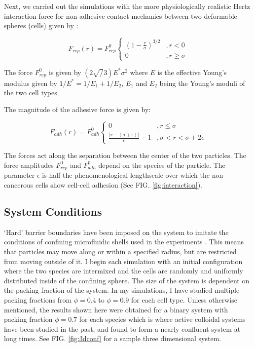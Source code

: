 \documentclass[aps,prb,twocolumn,groupedaddress,nofootinbib,floatfix]{revtex4}
\begin{document}
Next, we carried out the simulations with the more physiologically realistic Hertz interaction force for non-adhesive contact mechanics between two deformable spheres (cells) given by \cite{}:

\begin{equation}
  F_{rep}(r) = F^0_{rep} \left\{ 
    \begin{array}{lr}
      (1-\frac{r}{\sigma})^{3/2} &, r < 0\\
      0 &, r \ge \sigma
    \end{array}
  \right.
  \label{eq:frep}
\end{equation}

The force $F^0_{rep}$ is given by $(2 \sqrt/3) E^* \sigma^2$ where $E$ is the effective Young's modulus given by $1/E^*=1/E_1 + 1/E_2$, $E_1$ and $E_2$ being the Young's moduli of the two cell types. 


The magnitude of the adhesive force is given by:

\begin{equation}
  F_{adh}(r) =F^0_{adh} \left\{
    \begin{array}{lr}
      0 &, r \le \sigma \\
      \frac{|r - (\sigma+\epsilon)|}{\epsilon}-1 &, \sigma < r < \sigma+2\epsilon
    \end{array}
  \right.
  \label{eq:fadh}
\end{equation}

The forces act along the separation between the center of the two particles. The force amplitudes  $F^0_{rep}$ and $F^0_{adh}$ depend on the species of the particle.  The parameter $\epsilon$ is half the phenomenological lengthscale over which the non-cancerous cells show cell-cell adhesion (See FIG. \ref{fig:interaction}). 



\subsection{System Conditions}
`Hard' barrier boundaries have been imposed on the system to imitate the conditions of confining microfluidic shells used in the experiments \cite{Mingming}. 
This means that particles may move along or within a specified radius, but are restricted from moving outside of it.
I begin each simulation with an initial configuration where the two species are intermixed and the cells are randomly and uniformly distributed inside of the confining sphere.
The size of the system is dependent on the packing fraction of the system.
In my simulations, I have studied multiple packing fractions from $\phi=0.4$ to $\phi=0.9$ for each cell type. Unless otherwise mentioned, the results shown here were obtained
for a binary system with packing fraction $\phi=0.7$ for each species which is where active colloidal systems have been studied in the past\cite{RednerBaskaran}, and found to form a nearly confluent system at long times. 
See FIG. \ref{fig:3dconf} for a sample three dimensional system.
\end{document}
